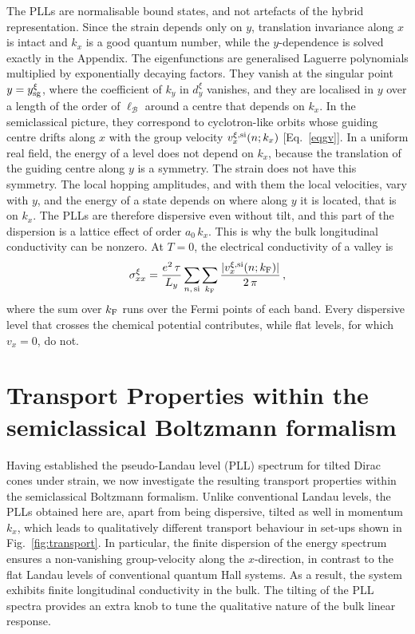 \documentclass[aps,prb, onecolumn, nofootinbib, citeautoscript,10pt]{revtex4-2}
\newcommand{\red}[1]{{\color{red}#1}}
\begin{document}
The PLLs are normalisable bound states, and not artefacts of the hybrid representation. Since the strain depends only on $y$, translation invariance along $x$ is intact and $k_x$ is a good quantum number, while the $y$-dependence is solved exactly in the Appendix. The eigenfunctions are generalised Laguerre polynomials multiplied by exponentially decaying factors. They vanish at the singular point $y=y^\xi_{\rm sg}$, where the coefficient of $k_y$ in $d^\xi_y$ vanishes, and they are localised in $y$ over a length of the order of $\ell_{\mathcal B}$ around a centre that depends on $k_x$. In the semiclassical picture, they correspond to cyclotron-like orbits whose guiding centre drifts along $x$ with the group velocity $v^{\xi,{\rm si}}_x(n;k_x)$ [Eq.~\eqref{eqgv}]. In a uniform real field, the energy of a level does not depend on $k_x$, because the translation of the guiding centre along $y$ is a symmetry. The strain does not have this symmetry. The local hopping amplitudes, and with them the local velocities, vary with $y$, and the energy of a state depends on where along $y$ it is located, that is on $k_x$. The PLLs are therefore dispersive even without tilt, and this part of the dispersion is a lattice effect of order $a_0\,k_x$. This is why the bulk longitudinal conductivity can be nonzero. At $T=0$, the electrical conductivity of a valley is
\begin{align}
\sigma^\xi_{xx}=\frac{e^2\,\tau}{L_y}\sum_{n,\,{\rm si}}\sum_{k_{\rm F}}\frac{|v^{\xi,{\rm si}}_x(n;k_{\rm F})|}{2\,\pi}\,,\label{eqsigT0}
\end{align}
where the sum over $k_{\rm F}$ runs over the Fermi points of each band. Every dispersive level that crosses the chemical potential contributes, while flat levels, for which $v_x=0$, do not.




\section{Transport Properties within the semiclassical Boltzmann formalism}
\label{sectransport}


Having established the pseudo-Landau level (PLL) spectrum for tilted Dirac cones under strain, we now investigate the resulting transport properties within the semiclassical Boltzmann formalism. Unlike conventional Landau levels, the PLLs obtained here \red{are, apart from being dispersive, tilted} as well in momentum $k_x$, which leads to qualitatively different transport \red{behaviour} in set-ups shown in Fig.~\ref{fig:transport}.
In particular, the finite dispersion of the energy spectrum ensures a non-vanishing group-velocity along the $x$-direction, in contrast to the flat Landau levels of conventional quantum Hall systems. As a result, the system exhibits finite longitudinal conductivity in the bulk. The tilting of the PLL spectra provides an extra knob to tune the qualitative nature of the bulk linear response.
\end{document}
